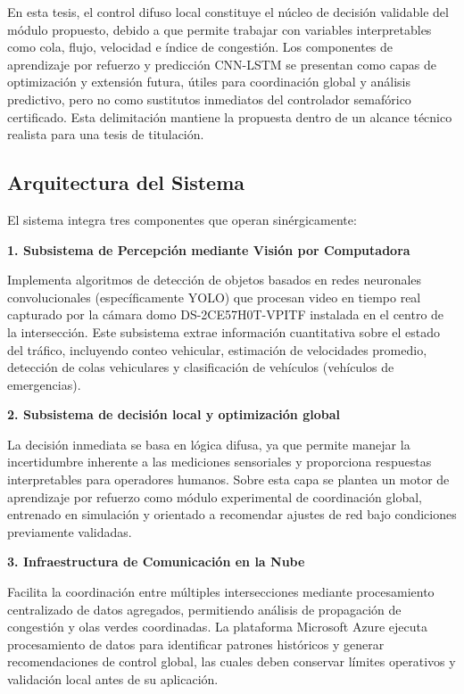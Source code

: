 \documentclass[12pt,a4paper,oneside]{report}
\begin{document}
En esta tesis, el control difuso local constituye el núcleo de decisión validable del módulo propuesto, debido a que permite trabajar con variables interpretables como cola, flujo, velocidad e índice de congestión. Los componentes de aprendizaje por refuerzo y predicción CNN-LSTM se presentan como capas de optimización y extensión futura, útiles para coordinación global y análisis predictivo, pero no como sustitutos inmediatos del controlador semafórico certificado. Esta delimitación mantiene la propuesta dentro de un alcance técnico realista para una tesis de titulación.

\subsection{Arquitectura del Sistema}\label{arquitectura-del-sistema}

El sistema integra tres componentes que operan sinérgicamente:

\textbf{1. Subsistema de Percepción mediante Visión por Computadora}

Implementa algoritmos de detección de objetos basados en redes neuronales convolucionales (específicamente YOLO) que procesan video en tiempo real capturado por la cámara domo DS-2CE57H0T-VPITF instalada en el centro de la intersección. Este subsistema extrae información cuantitativa sobre el estado del tráfico, incluyendo conteo vehicular, estimación de velocidades promedio, detección de colas vehiculares y clasificación de vehículos (vehículos de emergencias).

\textbf{2. Subsistema de decisión local y optimización global}

La decisión inmediata se basa en lógica difusa, ya que permite manejar la incertidumbre inherente a las mediciones sensoriales y proporciona respuestas interpretables para operadores humanos. Sobre esta capa se plantea un motor de aprendizaje por refuerzo como módulo experimental de coordinación global, entrenado en simulación y orientado a recomendar ajustes de red bajo condiciones previamente validadas.

\textbf{3. Infraestructura de Comunicación en la Nube}

Facilita la coordinación entre múltiples intersecciones mediante procesamiento centralizado de datos agregados, permitiendo análisis de propagación de congestión y olas verdes coordinadas. La plataforma Microsoft Azure ejecuta procesamiento de datos para identificar patrones históricos y generar recomendaciones de control global, las cuales deben conservar límites operativos y validación local antes de su aplicación.
\end{document}
